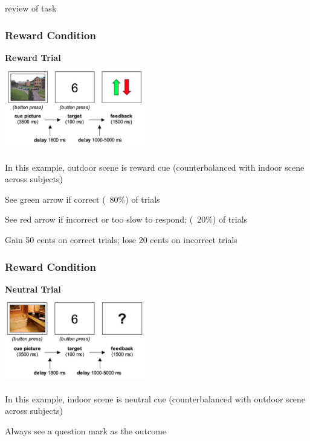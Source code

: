 \documentclass{beamer}
\begin{document}
\begin{section}{review of task}
\begin{frame}
\frametitle{Reward Condition}
\begin{center}
\bf{Reward Trial} \\
	\includegraphics[height=38mm,width=62mm]{rewardcond} \\
	\begin{itemize}
		\footnotesize{
		\item In this example, outdoor scene is reward cue (counterbalanced with indoor scene across subjects)
		\item See green arrow if correct (~80\%) of trials 
		\item See red arrow if incorrect or too slow to respond; (~20\%) of trials 
		\item Gain 50 cents on correct trials; lose 20 cents on incorrect trials}
	\end{itemize}
\end{center}
\end{frame}

\begin{frame}
\frametitle{Reward Condition}
\begin{center}
\bf{Neutral Trial} \\
	\includegraphics[height=38mm,width=62mm]{neutralcond} \\
	\begin{itemize}
		\footnotesize{
		\item  In this example, indoor scene is neutral cue (counterbalanced with outdoor scene across subjects)
		\item Always see a question mark as the outcome }
	\end{itemize}
\end{center}
\end{frame}


\end{section}
\end{document}
